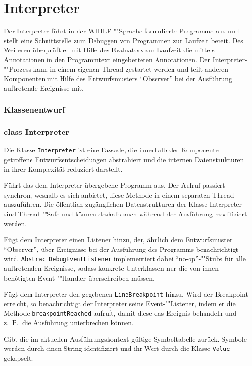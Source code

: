 \section{Interpreter}

Der Interpreter führt in der WHILE-""Sprache formulierte Programme aus und stellt eine Schnittstelle zum Debuggen von Programmen zur Laufzeit bereit. Des Weiteren überprüft er mit Hilfe des Evaluators zur Laufzeit die mittels Annotationen in den Programmtext eingebetteten Annotationen. Der Interpreter-""Prozess kann in einem eigenen Thread gestartet werden und teilt anderen Komponenten mit Hilfe des Entwurfsmusters ``Observer'' bei der Ausführung auftretende Ereignisse mit.

\subsubsection{Klassenentwurf}

\subsubsection{class Interpreter}
Die Klasse \texttt{Interpreter} ist eine Fassade, die innerhalb der Komponente getroffene Entwurfsentscheidungen abstrahiert und die internen Datenstrukturen in ihrer Komplexität reduziert darstellt.

\begin{description}

    Führt das dem Interpreter übergebene Programm aus. Der Aufruf passiert synchron, weshalb es sich anbietet, diese Methode in einem separaten Thread auszuführen. Die öffentlich zugänglichen Datenstrukturen der Klasse Interpreter sind Thread-""Safe und können deshalb auch während der Ausführung modifiziert werden.

    Fügt dem Interpreter einen Listener hinzu, der, ähnlich dem Entwurfsmuster ``Observer'', über Ereignisse bei der Ausführung des Programms benachrichtigt wird. \texttt{AbstractDebugEventListener} implementiert dabei ``no-op''-""Stubs für alle auftretenden Ereignisse, sodass konkrete Unterklassen nur die von ihnen benötigten Event-""Handler überschreiben müssen.

    Fügt dem Interpreter den gegebenen \texttt{LineBreakpoint} hinzu. Wird der Breakpoint erreicht, so benachrichtigt der Interpreter seine Event-""Listener, indem er die Methode \texttt{breakpointReached} aufruft, damit diese das Ereignis behandeln und z.~B.\ die Ausführung unterbrechen können.

     Gibt die im aktuellen Ausführungskontext gültige Symboltabelle zurück. Symbole werden durch einen String identifiziert und ihr Wert durch die Klasse \texttt{Value} gekapselt.
\end{description}

